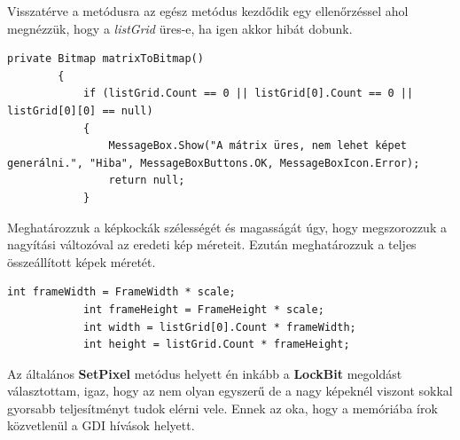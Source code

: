 \documentclass[]{thesis-ekf}
\theoremstyle{definition}
\theoremstyle{remark}
\begin{document}
	Visszatérve a metódusra az egész metódus kezdődik egy ellenőrzéssel ahol megnézzük, hogy a \emph{listGrid} üres-e, ha igen akkor hibát dobunk.
	\begin{lstlisting}[language=CSharp]
		private Bitmap matrixToBitmap()
		{
			if (listGrid.Count == 0 || listGrid[0].Count == 0 || listGrid[0][0] == null)
			{
				MessageBox.Show("A mátrix üres, nem lehet képet generálni.", "Hiba", MessageBoxButtons.OK, MessageBoxIcon.Error);
				return null;
			}
		\end{lstlisting}
		Meghatározzuk a képkockák szélességét és magasságát úgy, hogy megszorozzuk a nagyítási változóval az eredeti kép méreteit. Ezután meghatározzuk a teljes összeállított képek méretét.
		\begin{lstlisting}[language=CSharp]
			int frameWidth = FrameWidth * scale;
			int frameHeight = FrameHeight * scale;
			int width = listGrid[0].Count * frameWidth;
			int height = listGrid.Count * frameHeight;
		\end{lstlisting}
		Az általános \textbf{SetPixel} metódus helyett én inkább a \textbf{LockBit}\cite{lockbit}\cite{fastpixeloperation} megoldást választottam, igaz, hogy az nem olyan egyszerű de a nagy képeknél viszont sokkal gyorsabb teljesítményt tudok elérni vele. Ennek az oka, hogy a memóriába írok közvetlenül a GDI hívások helyett.
		
\end{document}
